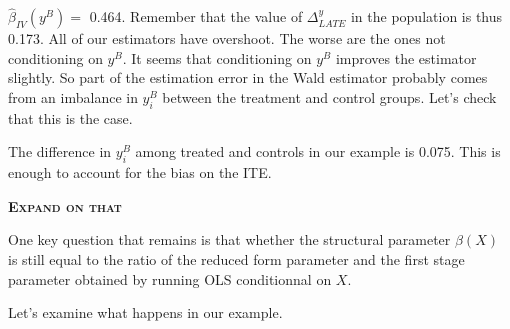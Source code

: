 \documentclass[]{book}
\newenvironment{Shaded}{\begin{snugshade}}{\end{snugshade}}
\newcommand{\DecValTok}[1]{\textcolor[rgb]{0.00,0.00,0.81}{#1}}
\newcommand{\KeywordTok}[1]{\textcolor[rgb]{0.13,0.29,0.53}{\textbf{#1}}}
\newcommand{\NormalTok}[1]{#1}
\newcommand{\OperatorTok}[1]{\textcolor[rgb]{0.81,0.36,0.00}{\textbf{#1}}}
\newcommand{\StringTok}[1]{\textcolor[rgb]{0.31,0.60,0.02}{#1}}
\theoremstyle{definition}
\theoremstyle{definition}
\theoremstyle{definition}
\theoremstyle{remark}
\let\BeginKnitrBlock\begin \let\EndKnitrBlock\end
\begin{document}
\(\hat{\beta}_{IV}(y^B)=\) 0.464.
Remember that the value of \(\Delta^y_{LATE}\) in the population is thus 0.173.
All of our estimators have overshoot.
The worse are the ones not conditioning on \(y^B\).
It seems that conditioning on \(y^B\) improves the estimator slightly.
So part of the estimation error in the Wald estimator probably comes from an imbalance in \(y_i^B\) between the treatment and control groups.
Let's check that this is the case.

\begin{Shaded}
\end{Shaded}

The difference in \(y_i^B\) among treated and controls in our example is 0.075.
This is enough to account for the bias on the ITE.

\textbf{\textsc{Expand on that}}

\BeginKnitrBlock{remark}
\iffalse{} {Remark. } \fi{}One key question that remains is that whether the structural parameter \(\beta(X)\) is still equal to the ratio of the reduced form parameter and the first stage parameter obtained by running OLS conditionnal on \(X\).
\EndKnitrBlock{remark}

\BeginKnitrBlock{example}
\protect\hypertarget{exm:unnamed-chunk-127}{}{\label{exm:unnamed-chunk-127} }Let's examine what happens in our example.
\EndKnitrBlock{example}

\begin{Shaded}
\end{Shaded}
\end{document}
